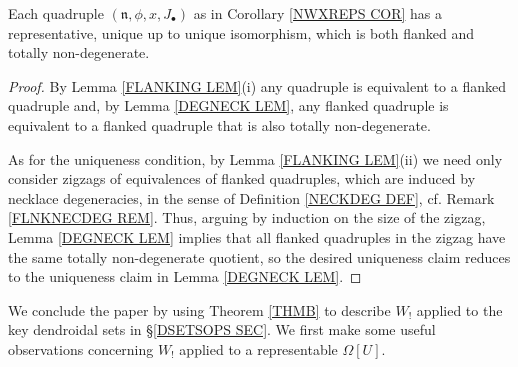 \documentclass{hha}
\theoremstyle{definition} %
\begin{document}
\begin{corollary}[{cf. \cite[Cor. 4.8]{DS11}}]
        \label{NWXREPS2_COR}
	Each quadruple $(\mathfrak{n},\phi,x,J_{\bullet})$ as in Corollary \ref{NWXREPS COR}
	has a representative, unique up to unique isomorphism,
	which is both flanked and totally non-degenerate.
\end{corollary}



\begin{proof}
	By Lemma \ref{FLANKING LEM}(i)
	any quadruple is equivalent to a flanked quadruple 
	and, by Lemma \ref{DEGNECK LEM},
	any flanked quadruple is equivalent to a flanked quadruple that is also totally non-degenerate.
	
	As for the uniqueness condition, 
	by Lemma \ref{FLANKING LEM}(ii)
	we need only consider zigzags of 
	equivalences of flanked quadruples, 
	which are induced by necklace degeneracies, 
	in the sense of Definition \ref{NECKDEG DEF},
	cf. Remark \ref{FLNKNECDEG REM}.
	Thus, arguing by induction on the size of the zigzag,
	Lemma \ref{DEGNECK LEM} implies that 
	all flanked quadruples in the zigzag have the same
	totally non-degenerate quotient,
	so the desired uniqueness claim reduces to the uniqueness claim
	in Lemma \ref{DEGNECK LEM}.
\end{proof}




We conclude the paper by using Theorem \ref{THMB}
to describe $W_!$ applied to the 
key dendroidal sets in \S \ref{DSETSOPS SEC}.
We first make some useful observations
concerning $W_!$ applied to a representable $\Omega[U]$. 
\end{document}
